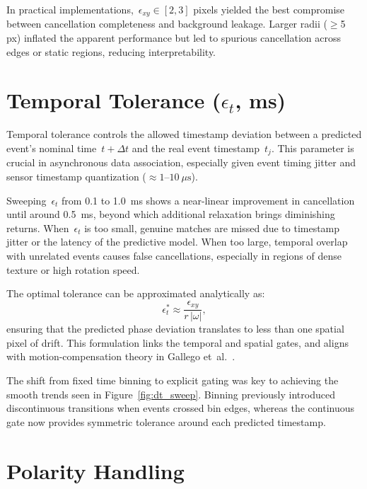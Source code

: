 In practical implementations,~\(\epsilon_{xy}\in[2,3]\) pixels yielded the best compromise between cancellation completeness and background leakage.
Larger radii (\(\geq\)5 px) inflated the apparent performance but led to spurious cancellation across edges or static regions, reducing interpretability.

\section{Temporal Tolerance (\( \epsilon_{t} \), ms)}
\label{sec:temporal_tolerance}

Temporal tolerance controls the allowed timestamp deviation between a predicted event’s nominal time~\(t+\Delta t\) and the real event timestamp~\(t_j\).
This parameter is crucial in asynchronous data association, especially given event timing jitter and sensor timestamp quantization (\( \approx 1\text{--}10~\mu\text{s} \)).

Sweeping~\(\epsilon_t\) from 0.1 to 1.0~ms shows a near-linear improvement in cancellation until around 0.5~ms, beyond which additional relaxation brings diminishing returns.
When~\(\epsilon_t\) is too small, genuine matches are missed due to timestamp jitter or the latency of the predictive model.
When too large, temporal overlap with unrelated events causes false cancellations, especially in regions of dense texture or high rotation speed.

The optimal tolerance can be approximated analytically as:
\[
\epsilon_t^{*} \approx \frac{\epsilon_{xy}}{r\,|\omega|},
\]
ensuring that the predicted phase deviation translates to less than one spatial pixel of drift.
This formulation links the temporal and spatial gates, and aligns with motion-compensation theory in Gallego et~al.~\cite{Gallego2018CMax, Xu2020TCI}.

The shift from fixed time binning to explicit gating was key to achieving the smooth trends seen in Figure~\ref{fig:dt_sweep}.
Binning previously introduced discontinuous transitions when events crossed bin edges, whereas the continuous gate now provides symmetric tolerance around each predicted timestamp.

\section{Polarity Handling}
\label{sec:polarity}

